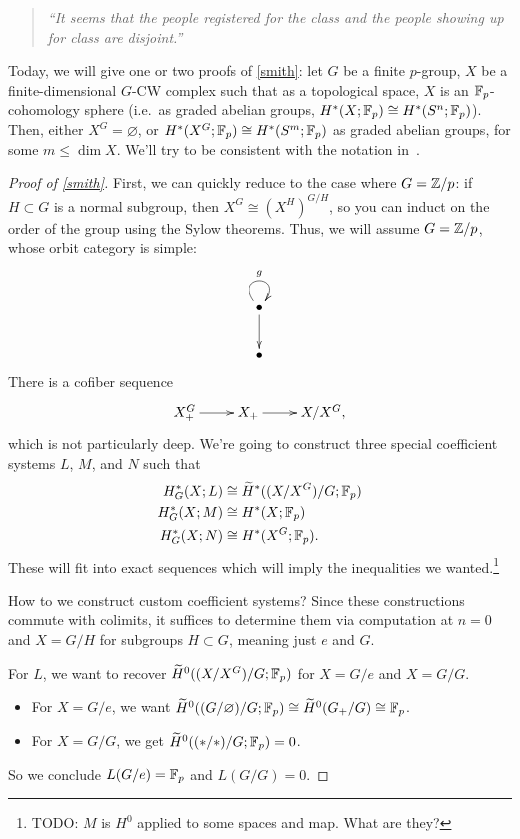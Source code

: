 \begin{quote}\textit{
	``It seems that the people registered for the class and the people showing up for class are disjoint.''
}\end{quote}
Today, we will give one or two proofs of \cref{smith}: let $G$ be a finite $p$-group, $X$ be a finite-dimensional
$G$-CW complex such that as a topological space, $X$ is an $\mathbb F_p$-cohomology sphere (i.e.\ as graded abelian
groups, $H^*(X;\mathbb F_p)\cong H^*(S^n;\mathbb F_p)$). Then, either $X^G = \varnothing$, or $H^*(X^G;\mathbb F_p)\cong H^*(S^m;\mathbb F_p)$
as graded abelian groups, for some $m\le\dim X$. We'll try to be consistent with the notation
in~\cite{MaySmithTheory, AlaskaNotes}.
\begin{proof}[Proof of \cref{smith}]
First, we can quickly reduce to the case where $G = \mathbb Z/p$: if $H\subset G$ is a normal subgroup, then $X^G\cong
(X^H)^{G/H}$, so you can induct on the order of the group using the Sylow theorems. Thus, we will assume $G =
\mathbb Z/p$, whose orbit category is simple:
\[\xymatrix{
	\bullet\ar@(ul, ur)^g\ar[d]\\
	\bullet
}\]
There is a cofiber sequence
\[\xymatrix{
	X_+^G\ar[r] & X_+\ar[r] & X/X^G,
}\]
which is not particularly deep. We're going to construct three special coefficient systems $L$, $M$, and $N$ such
that
\begin{align*}
	H_G^*(X;L) &\cong \widetilde H^*((X/X^G)/G; \mathbb F_p)\\
	H_G^*(X;M) &\cong H^*(X;\mathbb F_p)\\
	H_G^*(X;N) &\cong H^*(X^G;\mathbb F_p).
\end{align*}
These will fit into exact sequences which will imply the inequalities we wanted.\footnote{{\color{red}TODO}: $M$ is
$H^0$ applied to some spaces and map. What are they?}

How to we construct custom coefficient systems? Since these constructions commute with colimits, it suffices to
determine them via computation at $n = 0$ and $X = G/H$ for subgroups $H\subset G$, meaning just $e$ and $G$.

For $L$, we want to recover $\widetilde H^0((X/X^G)/G;\mathbb F_p)$ for $X = G/e$ and $X = G/G$.
\begin{itemize}
	\item For $X = G/e$, we want $\widetilde H^0((G/\varnothing)/G;\mathbb F_p)\cong \widetilde H^0(G_+/G)\cong\mathbb F_p$.
	\item For $X = G/G$, we get $\widetilde H^0((*/*)/G;\mathbb F_p) = 0$.
\end{itemize}
So we conclude $L(G/e) = \mathbb F_p$ and $L(G/G) = 0$.


\end{proof}
